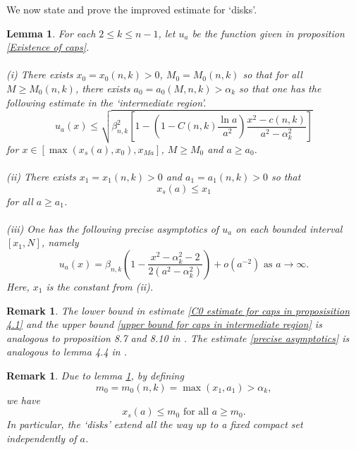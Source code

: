 \documentclass[pdflatex,sn-mathphys-num]{sn-jnl}
\newtheorem{lemma}[theorem]{Lemma}
\newtheorem{remark}[theorem]{Remark}
\begin{document}
We now state and prove the improved estimate for `disks'.
\begin{lemma}\label{Improved C^0 estimate}
For each $2 \leq k \leq n-1$, let $u_a$ be the function given in proposition \ref{Existence of caps}. \\\\
(i) There exists $x_0 = x_0(n,k) > 0$, $M_0 = M_0(n,k)$ so that for all $M \geq M_0(n,k)$, there exists $a_0 = a_0(M, n, k) > \alpha_k$ so that one has the following estimate in the `intermediate region'.
    \begin{equation}\label{upper bound for caps in intermediate region}
        u_a(x) \leq \sqrt{\beta_{n,k}^2[1 - (1 - C(n,k)\frac{\ln a}{a^2})\frac{x^2 - c(n,k)}{a^2 - \alpha_k^2}]}
    \end{equation}
    for $x \in [\max(x_{s}(a), x_0), x_{Ma}]$, $M \geq M_0$ and $a \geq a_0$.\\\\
(ii) There exists $x_1 = x_1(n,k) > 0$ and $a_1 = a_1(n,k) > 0 $ so that 
    \begin{equation}\label{rough upper bound for x0(a)}
        x_{s}(a) \leq x_1
    \end{equation}
for all $a \geq a_1$.\\\\
 (iii) One has the following precise asymptotics of $u_a$ on each bounded interval $[x_1, N]$, namely
    \begin{equation}\label{precise asymptotics}
        u_a(x) = \beta_{n,k}(1 - \frac{x^2 - \alpha_k^2 - 2}{2(a^2 - \alpha_k^2)}) + o(a^{-2}) \text{ as }a \to \infty.
    \end{equation}
    Here, $x_1$ is the constant from (ii).
\end{lemma}
\begin{remark}
    The lower bound in estimate \eqref{C0 estimate for caps in proposisition 4.1} and the upper bound \eqref{upper bound for caps in intermediate region} is analogous to proposition 8.7 and 8.10 in \cite{ADS}. The estimate \eqref{precise asymptotics} is analogous to lemma 4.4 in \cite{ADS}.
\end{remark}
\begin{remark}\label{Upper bound of starting point for caps}
    Due to lemma \ref{Improved C^0 estimate}, by defining
  \begin{equation}
      m_0 = m_0(n,k) = \max(x_1, a_1) > \alpha_k,
  \end{equation}
    we have
\begin{equation}
    x_{s}(a) \leq m_0 \text{ for all }a \geq m_0.
\end{equation}
In particular, the `disks' extend all the way up to a fixed compact set independently of $a$.
\end{remark}
\end{document}
